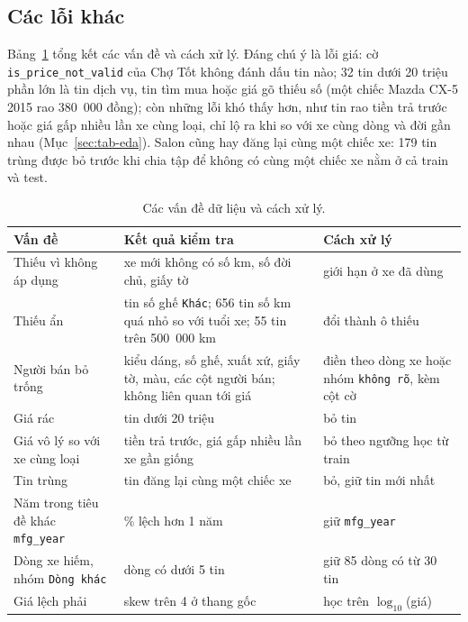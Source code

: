 \subsection{Các lỗi khác}

Bảng~\ref{tab:tab-issues} tổng kết các vấn đề và cách xử lý. Đáng chú ý là lỗi giá: cờ \texttt{is\_price\_not\_valid}
của Chợ Tốt không đánh dấu tin nào; 32 tin dưới 20 triệu phần lớn là tin dịch vụ, tin tìm mua hoặc giá gõ thiếu số (một
chiếc Mazda CX-5 2015 rao 380~000 đồng); còn những lỗi khó thấy hơn, như tin rao tiền trả trước hoặc giá gấp nhiều lần
xe cùng loại, chỉ lộ ra khi so với xe cùng dòng và đời gần nhau (Mục~\ref{sec:tab-eda}). Salon cũng hay đăng lại cùng
một chiếc xe: 179 tin trùng được bỏ trước khi chia tập để không có cùng một chiếc xe nằm ở cả train và test.

\begin{table}[H]\centering
\caption{Các vấn đề dữ liệu và cách xử lý.}\label{tab:tab-issues}
\begin{tabular}{>{\raggedright\arraybackslash}p{3.6cm}>{\raggedright\arraybackslash}p{6.4cm}>{\raggedright\arraybackslash}p{4.6cm}}
\toprule
Vấn đề & Kết quả kiểm tra & Cách xử lý \\
\midrule
Thiếu vì không áp dụng & xe mới không có số km, số đời chủ, giấy tờ & giới hạn ở xe đã dùng \\
Thiếu ẩn & 490 tin số ghế \texttt{Khác}; 656 tin số km quá nhỏ so với tuổi xe; 55 tin trên 500~000 km & đổi thành ô thiếu \\
Người bán bỏ trống & kiểu dáng, số ghế, xuất xứ, giấy tờ, màu, các cột người bán; không liên quan tới giá & điền theo dòng xe hoặc nhóm \texttt{không rõ}, kèm cột cờ \\
Giá rác & 32 tin dưới 20 triệu & bỏ tin \\
Giá vô lý so với xe cùng loại & tiền trả trước, giá gấp nhiều lần xe gần giống & bỏ theo ngưỡng học từ train \\
Tin trùng & 179 tin đăng lại cùng một chiếc xe & bỏ, giữ tin mới nhất \\
Năm trong tiêu đề khác \texttt{mfg\_year} & 1.3\% lệch hơn 1 năm & giữ \texttt{mfg\_year} \\
Dòng xe hiếm, nhóm \texttt{Dòng khác} & 212 dòng có dưới 5 tin & giữ 85 dòng có từ 30 tin \\
Giá lệch phải & skew trên 4 ở thang gốc & học trên $\log_{10}$(giá) \\
\bottomrule
\end{tabular}
\end{table}

